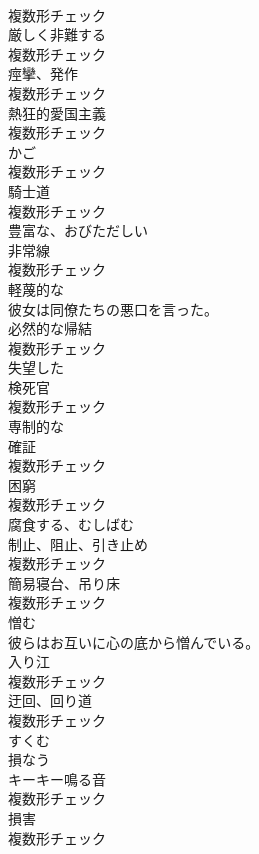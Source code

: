 \documentclass[8pt]{extreport}
\begin{document}
\begin{CJK}{UTF8}{min}
\\	複数形チェック
\\	[名詞]	厳しく非難する	
\\	複数形チェック
\\	[名詞]	痙攣、発作	
\\	複数形チェック
\\	[名詞]	熱狂的愛国主義	
\\	複数形チェック
\\	[名詞]	かご	
\\	複数形チェック
\\	[名詞]	騎士道	
\\	複数形チェック
\\	[形容詞]	豊富な、おびただしい	
\\	[名詞]	非常線	
\\	複数形チェック
\\	[形容詞]	軽蔑的な	
\\	彼女は同僚たちの悪口を言った。	
\\	[名詞]	必然的な帰結	
\\	複数形チェック
\\	[形容詞]	失望した	
\\	[名詞]	検死官	
\\	複数形チェック
\\	[形容詞]	専制的な	
\\	[名詞]	確証	
\\	複数形チェック
\\	[名詞]	困窮	
\\	複数形チェック
\\	[動詞]	腐食する、むしばむ	
\\	[名詞]	制止、阻止、引き止め	
\\	複数形チェック
\\	[名詞]	簡易寝台、吊り床	
\\	複数形チェック
\\	[動詞]	憎む	
\\	彼らはお互いに心の底から憎んでいる。	
\\	[名詞]	入り江	
\\	複数形チェック
\\	[名詞]	迂回、回り道	
\\	複数形チェック
\\	[動詞]	すくむ	
\\	[動詞]	損なう	
\\	[名詞]	キーキー鳴る音	
\\	複数形チェック
\\	[名詞]	損害	
\\	複数形チェック

\end{CJK}
\end{document}
